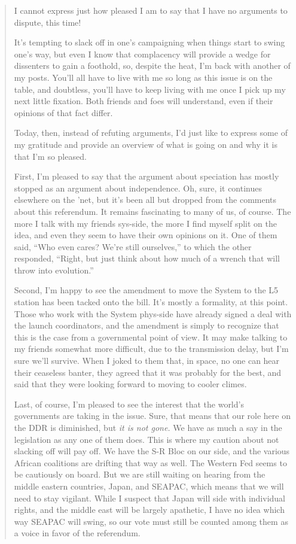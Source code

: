 \begin{quote}
I cannot express just how pleased I am to say that I have no arguments to dispute, this time!

It's tempting to slack off in one's campaigning when things start to swing one's way, but even I know that complacency will provide a wedge for dissenters to gain a foothold, so, despite the heat, I'm back with another of my posts. You'll all have to live with me so long as this issue is on the table, and doubtless, you'll have to keep living with me once I pick up my next little fixation. Both friends and foes will understand, even if their opinions of that fact differ.

Today, then, instead of refuting arguments, I'd just like to express some of my gratitude and provide an overview of what is going on and why it is that I'm so pleased.

First, I'm pleased to say that the argument about speciation has mostly stopped as an argument about independence. Oh, sure, it continues elsewhere on the 'net, but it's been all but dropped from the comments about this referendum. It remains fascinating to many of us, of course. The more I talk with my friends sys-side, the more I find myself split on the idea, and even they seem to have their own opinions on it. One of them said, ``Who even cares? We're still ourselves,'' to which the other responded, ``Right, but just think about how much of a wrench that will throw into evolution.''

Second, I'm happy to see the amendment to move the System to the L5 station has been tacked onto the bill. It's mostly a formality, at this point. Those who work with the System phys-side have already signed a deal with the launch coordinators, and the amendment is simply to recognize that this is the case from a governmental point of view. It may make talking to my friends somewhat more difficult, due to the transmission delay, but I'm sure we'll survive. When I joked to them that, in space, no one can hear their ceaseless banter, they agreed that it was probably for the best, and said that they were looking forward to moving to cooler climes.

Last, of course, I'm pleased to see the interest that the world's governments are taking in the issue. Sure, that means that our role here on the DDR is diminished, but \emph{it is not gone.} We have as much a say in the legislation as any one of them does. This is where my caution about not slacking off will pay off. We have the S-R Bloc on our side, and the various African coalitions are drifting that way as well. The Western Fed seems to be cautiously on board. But we are still waiting on hearing from the middle eastern countries, Japan, and SEAPAC, which means that we will need to stay vigilant. While I suspect that Japan will side with individual rights, and the middle east will be largely apathetic, I have no idea which way SEAPAC will swing, so our vote must still be counted among them as a voice in favor of the referendum.


\end{quote}
